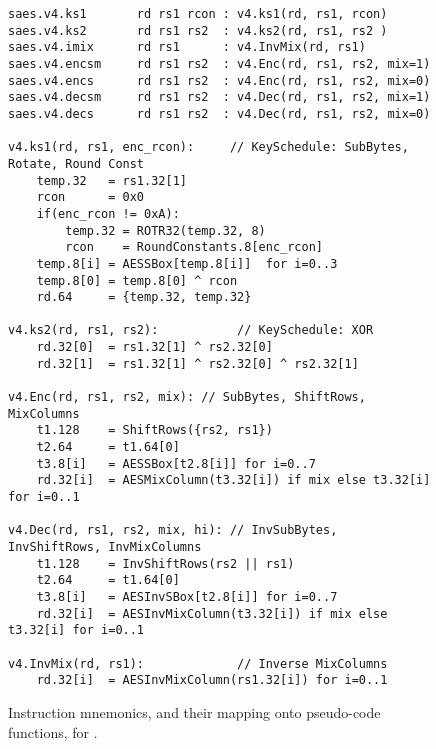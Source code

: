 \begin{figure}[p]
\begin{lstlisting}[language=pseudo,style=block]
saes.v4.ks1       rd rs1 rcon : v4.ks1(rd, rs1, rcon)
saes.v4.ks2       rd rs1 rs2  : v4.ks2(rd, rs1, rs2 )
saes.v4.imix      rd rs1      : v4.InvMix(rd, rs1)
saes.v4.encsm     rd rs1 rs2  : v4.Enc(rd, rs1, rs2, mix=1)
saes.v4.encs      rd rs1 rs2  : v4.Enc(rd, rs1, rs2, mix=0)
saes.v4.decsm     rd rs1 rs2  : v4.Dec(rd, rs1, rs2, mix=1)
saes.v4.decs      rd rs1 rs2  : v4.Dec(rd, rs1, rs2, mix=0)

v4.ks1(rd, rs1, enc_rcon):     // KeySchedule: SubBytes, Rotate, Round Const
    temp.32   = rs1.32[1]
    rcon      = 0x0
    if(enc_rcon != 0xA):
        temp.32 = ROTR32(temp.32, 8)
        rcon    = RoundConstants.8[enc_rcon]
    temp.8[i] = AESSBox[temp.8[i]]  for i=0..3
    temp.8[0] = temp.8[0] ^ rcon
    rd.64     = {temp.32, temp.32}

v4.ks2(rd, rs1, rs2):           // KeySchedule: XOR
    rd.32[0]  = rs1.32[1] ^ rs2.32[0]
    rd.32[1]  = rs1.32[1] ^ rs2.32[0] ^ rs2.32[1]

v4.Enc(rd, rs1, rs2, mix): // SubBytes, ShiftRows, MixColumns
    t1.128    = ShiftRows({rs2, rs1})
    t2.64     = t1.64[0]
    t3.8[i]   = AESSBox[t2.8[i]] for i=0..7
    rd.32[i]  = AESMixColumn(t3.32[i]) if mix else t3.32[i] for i=0..1

v4.Dec(rd, rs1, rs2, mix, hi): // InvSubBytes, InvShiftRows, InvMixColumns
    t1.128    = InvShiftRows(rs2 || rs1)
    t2.64     = t1.64[0]
    t3.8[i]   = AESInvSBox[t2.8[i]] for i=0..7
    rd.32[i]  = AESInvMixColumn(t3.32[i]) if mix else t3.32[i] for i=0..1

v4.InvMix(rd, rs1):             // Inverse MixColumns
    rd.32[i]  = AESInvMixColumn(rs1.32[i]) for i=0..1
\end{lstlisting}
\caption{
  Instruction mnemonics, and their mapping onto pseudo-code functions, for .
}
\label{fig:v4:pseudo}
\end{figure}

